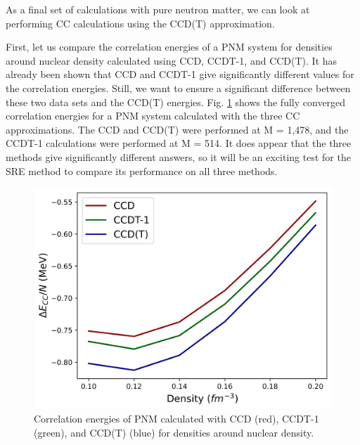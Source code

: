 As a final set of calculations with pure neutron matter, we can look at performing CC calculations using the CCD(T) approximation.

First, let us compare the correlation energies of a PNM system for densities around nuclear density calculated using CCD, CCDT-1, and CCD(T).  It has already been shown that CCD and CCDT-1 give significantly different values for the correlation energies. Still, we want to ensure a significant difference between these two data sets and the CCD(T) energies. Fig. \ref{fig:compare_pnm_all_no_sre} shows the fully converged correlation energies for a PNM system calculated with the three CC approximations.  The CCD and CCD(T) were performed at M = 1,478, and the CCDT-1 calculations were performed at M = 514.  It does appear that the three methods give significantly different answers, so it will be an exciting test for the SRE method to compare its performance on all three methods.

\begin{figure}
    \centering
    \includegraphics[scale=0.75]{Images/Chapter8/pnm_all_sre.png}
    \caption{Correlation energies of PNM calculated with CCD (red), CCDT-1 (green), and CCD(T) (blue) for densities around nuclear density.}
    \label{fig:compare_pnm_all_no_sre}
\end{figure}


